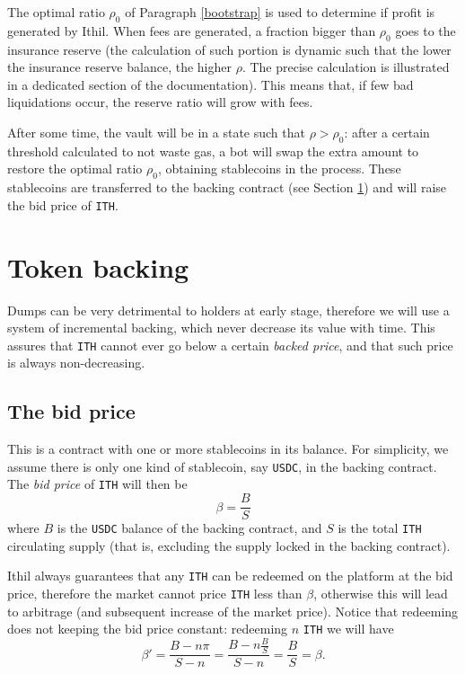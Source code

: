 \documentclass[a4paper,10 pt]{article}
\theoremstyle{definition}
\begin{document}
The optimal ratio $\rho_0$ of Paragraph \ref{bootstrap} is used to determine if profit is generated by Ithil. When fees are generated, a fraction bigger than $\rho_0$ goes to the insurance reserve (the calculation of such portion is dynamic such that the lower the insurance reserve balance, the higher $\rho$. The precise calculation is illustrated in a dedicated section of the documentation). This means that, if few bad liquidations occur, the reserve ratio will grow with fees.

After some time, the vault will be in a state such that $\rho > \rho_0$: after a certain threshold calculated to not waste gas, a bot will swap the extra amount to restore the optimal ratio $\rho_0$, obtaining stablecoins in the process. These stablecoins are transferred to the backing contract (see Section \ref{backing}) and will raise the bid price of \verb|ITH|.

\section{Token backing}\label{backing}

Dumps can be very detrimental to holders at early stage, therefore we will use a system of incremental backing, which never decrease its value with time. This assures that \verb|ITH| cannot ever go below a certain {\it backed price}, and that such price is always non-decreasing.

\subsection{The bid price}

This is a contract with one or more stablecoins in its balance. For simplicity, we assume there is only one kind of stablecoin, say \verb|USDC|, in the backing contract. The {\it bid price} of \verb|ITH| will then be
\begin{equation}\label{bid price}
\beta = \frac{B}{S}
\end{equation} 
where $B$ is the \verb|USDC| balance of the backing contract, and $S$ is the total \verb|ITH| circulating supply (that is, excluding the supply locked in the backing contract).

Ithil always guarantees that any \verb|ITH| can be redeemed on the platform at the bid price, therefore the market cannot price \verb|ITH| less than $\beta$, otherwise this will lead to arbitrage (and subsequent increase of the market price). Notice that redeeming does not  keeping the bid price constant: redeeming $n$ \verb|ITH| we will have
$$\beta' = \frac{B - n\pi}{S - n} = \frac{B - n\frac{B}{S}}{S-n} = \frac{B}{S} = \beta.$$
\end{document}
